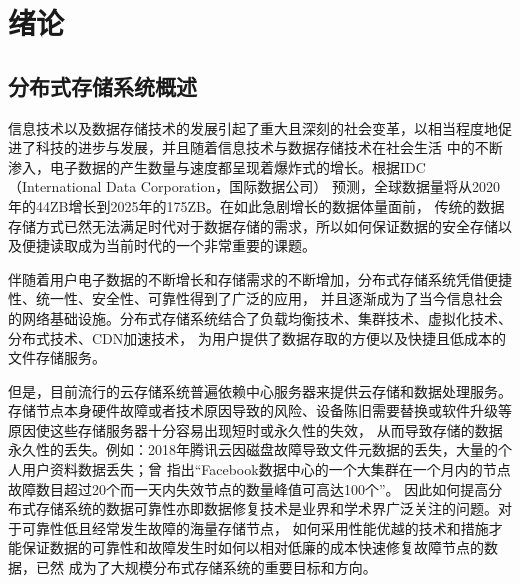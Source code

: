 \chapter{绪论}

\section{分布式存储系统概述}
信息技术以及数据存储技术的发展引起了重大且深刻的社会变革，以相当程度地促进了科技的进步与发展，并且随着信息技术与数据存储技术在社会生活
中的不断渗入，电子数据的产生数量与速度都呈现着爆炸式的增长。根据IDC（International Data Corporation，国际数据公司）
预测，全球数据量将从2020年的44ZB增长到2025年的175ZB\cite{rydning2018digitization}。在如此急剧增长的数据体量面前，
传统的数据存储方式已然无法满足时代对于数据存储的需求，所以如何保证数据的安全存储以及便捷读取成为当前时代的一个非常重要的课题。

伴随着用户电子数据的不断增长和存储需求的不断增加，分布式存储系统凭借便捷性、统一性、安全性、可靠性得到了广泛的应用，
并且逐渐成为了当今信息社会的网络基础设施。分布式存储系统结合了负载均衡技术、集群技术、虚拟化技术、分布式技术、CDN加速技术，
为用户提供了数据存取的方便以及快捷且低成本的文件存储服务。

但是，目前流行的云存储系统普遍依赖中心服务器来提供云存储和数据处理服务\cite{wang2018blockchain}。
存储节点本身硬件故障或者技术原因导致的风险、设备陈旧需要替换或软件升级等原因使这些存储服务器十分容易出现短时或永久性的失效，
从而导致存储的数据永久性的丢失。例如：2018年腾讯云因磁盘故障导致文件元数据的丢失，大量的个人用户资料数据丢失；\citet{sathiamoorthy2013xoring}曾
指出“Facebook数据中心的一个大集群在一个月内的节点故障数目超过20个而一天内失效节点的数量峰值可高达100个”。
因此如何提高分布式存储系统的数据可靠性亦即数据修复技术是业界和学术界广泛关注的问题。对于可靠性低且经常发生故障的海量存储节点，
如何采用性能优越的技术和措施才能保证数据的可靠性和故障发生时如何以相对低廉的成本快速修复故障节点的数据，已然
成为了大规模分布式存储系统的重要目标和方向。

